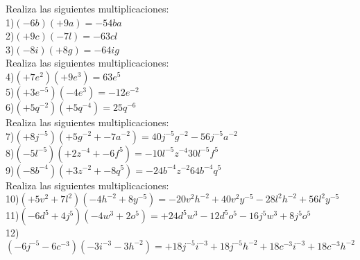 \documentclass[a4paper,12pt]{article}
\begin{document}
 \pagebreak 
Realiza las siguientes multiplicaciones: \vspace{1cm}\\ 
1)$(-6b)(+9a)=-54ba $\vspace{1cm}\\ 
2)$(+9c)(-7l)=-63cl $\vspace{1cm}\\ 
3)$(-8i)(+8g)=-64ig $\vspace{1cm}\\ 
Realiza las siguientes multiplicaciones: \vspace{1cm}\\ 
4)$(+7e^{2})(+9e^{3} )=63e^{5} $\vspace{1cm}\\ 
5)$(+3e^{-5})(-4e^{3} )=-12e^{-2} $\vspace{1cm}\\ 
6)$(+5q^{-2})(+5q^{-4} )=25q^{-6} $\vspace{1cm}\\ 
Realiza las siguientes multiplicaciones: \vspace{1cm}\\ 
7)$(+8j^{-5})(+5g^{-2}+-7a^{-2} )= 40j^{-5}g^{-2}-56j^{-5}a^{-2}   $\vspace{1cm}\\ 
8)$(-5l^{-5})(+2z^{-4}+-6f^{5} )= -10l^{-5}z^{-4}30l^{-5}f^{5}   $\vspace{1cm}\\ 
9)$(-8b^{-4})(+3z^{-2}+-8q^{5} )= -24b^{-4}z^{-2}64b^{-4}q^{5}   $\vspace{1cm}\\ 
Realiza las siguientes multiplicaciones: \vspace{1cm}\\ 
10)$(+5v^{2}+7l^{2} )(-4h^{-2}+8y^{-5} )= -20v^{2}h^{-2}+40v^{2}y^{-5}-28l^{2}h^{-2}+56l^{2}y^{-5}$\vspace{1cm}\\ 
11)$(-6d^{5}+4j^{5} )(-4w^{3}+2o^{5} )= +24d^{5}w^{3}-12d^{5}o^{5}-16j^{5}w^{3}+8j^{5}o^{5}$\vspace{1cm}\\ 
12)$(-6j^{-5}-6c^{-3} )(-3i^{-3}-3h^{-2} )= +18j^{-5}i^{-3}+18j^{-5}h^{-2}+18c^{-3}i^{-3}+18c^{-3}h^{-2}$\vspace{1cm}\\ 
\end{document}
